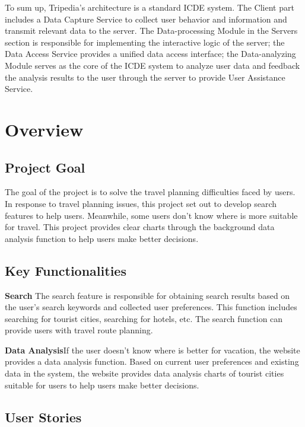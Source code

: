 \documentclass[conference]{IEEEtran}
\begin{document}
To sum up, Tripedia's architecture is a standard ICDE system. The Client part includes a Data Capture Service to collect user behavior and information and transmit relevant data to the server. The Data-processing Module in the Servers section is responsible for implementing the interactive logic of the server; the Data Access Service provides a unified data access interface; the Data-analyzing Module serves as the core of the ICDE system to analyze user data and feedback the analysis results to the user through the server to provide User Assistance Service.

\section{Overview}



\subsection{Project Goal}

The goal of the project is to solve the travel planning difficulties faced by users. In response to travel planning issues, this project set out to develop search features to help users. Meanwhile, some users don’t know where is more suitable for travel. This project provides clear charts through the background data analysis function to help users make better decisions. 

\subsection{Key Functionalities}

\textbf{Search} The search feature is responsible for obtaining search results based on the user's search keywords and collected user preferences. This function includes searching for tourist cities, searching for hotels, etc. The search function can provide users with travel route planning.

\textbf{Data Analysis}If the user doesn't know where is better for vacation, the website provides a data analysis function. Based on current user preferences and existing data in the system, the website provides data analysis charts of tourist cities suitable for users to help users make better decisions.

\subsection{User Stories}
\end{document}
